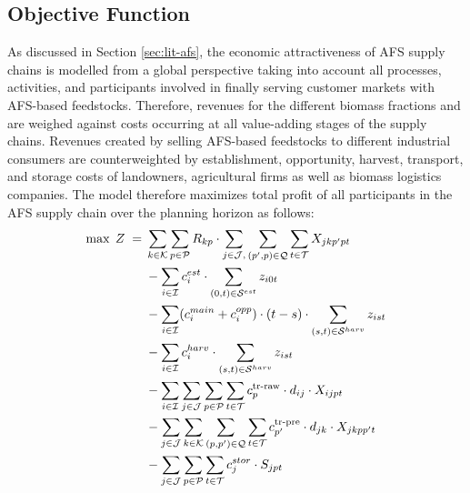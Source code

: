 \documentclass[APA,TimesLARGE]{WileyNJDv5} %
\newcommand{\Tc}{\mathcal{T}}
\newcommand{\Pc}{\mathcal{P}}
\newcommand{\Qc}{\mathcal{Q}}
\newcommand{\Sc}{\mathcal{S}}
\newcommand{\Ic}{\mathcal{I}}
\newcommand{\Jc}{\mathcal{J}}
\newcommand{\Kc}{\mathcal{K}}
\begin{document}
\subsection{Objective Function}\label{objective-function}

As discussed in Section \autoref{sec:lit-afs}, the economic attractiveness of AFS supply chains is modelled from a global perspective taking into account all processes, activities, and participants involved in finally serving customer markets with AFS-based feedstocks. Therefore, revenues for the different biomass fractions and are weighed against costs occurring at all value-adding stages of the supply chains. Revenues created by selling AFS-based feedstocks to different industrial consumers are counterweighted by establishment, opportunity, harvest, transport, and storage costs of landowners, agricultural firms as well as biomass logistics companies. The model therefore maximizes total profit of all participants in the AFS supply chain over the planning horizon as follows:
\begin{align}
\max\; Z \;=\;&
  \sum_{k \in \Kc}\sum_{p \in \Pc} R_{kp} \cdot \sum_{j \in \Jc, }\sum_{(p',p) \in \Qc} \sum_{t \in \Tc}  X_{jkp'pt}  \label{eq:obj-revenue} \\
&- \sum_{i \in \Ic} c^{{est}}_i \cdot \sum_{(0,t) \in \Sc^{{est}}} z_{i0t} \notag \\
&- \sum_{i \in \Ic} (c^{main}_{i} + c^{{opp}}_i) \cdot (t-s) \cdot \sum_{(s,t) \in \Sc^{{harv}}} z_{ist} \notag \\
&- \sum_{i \in \Ic} c^{{harv}}_i  \cdot \sum_{(s,t) \in \Sc^{{harv}}} z_{ist} \notag \\
&- \sum_{i \in \Ic}\sum_{j \in \Jc}\sum_{p \in \Pc}\sum_{t \in \Tc} c^{\text{tr-raw}}_p \cdot d_{ij} \cdot X_{ijpt} \notag \\
&- \sum_{j \in \Jc}\sum_{k \in \Kc}\sum_{(p,p') \in \Qc} \sum_{t \in \Tc} c^{\text{tr-pre}}_{p'} \cdot d_{jk} \cdot X_{jkpp't} \notag \\
&- \sum_{j \in \Jc}\sum_{p \in \Pc}\sum_{t \in \Tc}  c^{{stor}}_j \cdot S_{jpt}  \notag
\end{align}
\end{document}
